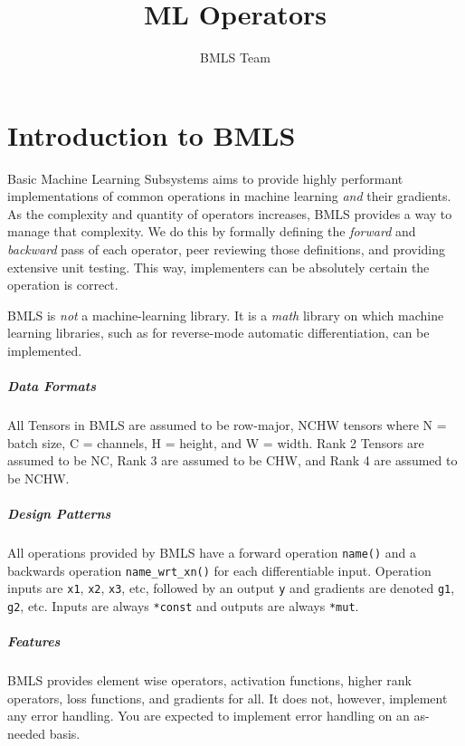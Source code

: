 \documentclass{report}
\title{ML Operators}
\author{BMLS Team}
\begin{document}
    \maketitle

    \tableofcontents

    \chapter{Introduction to BMLS}

    Basic Machine Learning Subsystems aims to provide highly performant implementations of common operations in machine learning \textit{and}
    their gradients. As the complexity and quantity of operators increases, BMLS provides a way to manage that complexity. We do this by 
    formally defining the \textit{forward} and \textit{backward} pass of each operator, peer reviewing those definitions, and providing extensive
    unit testing. This way, implementers can be absolutely certain the operation is correct.

        BMLS is \textit{not} a machine-learning library. It is a \textit{math} library on which machine learning libraries, such as for reverse-mode
        automatic differentiation, can be implemented.

        \paragraph{Data Formats}
        All Tensors in BMLS are assumed to be row-major, NCHW tensors where N = batch size, C = channels, H = height, and W = width. Rank 2 Tensors
        are assumed to be NC, Rank 3 are assumed to be CHW, and Rank 4 are assumed to be NCHW. 

        \paragraph{Design Patterns}
        All operations provided by BMLS have a forward operation \verb|name()| and a backwards operation \verb|name_wrt_xn()| for each 
        differentiable input. Operation inputs are \verb|x1|, \verb|x2|, \verb|x3|, etc, followed by an output \verb|y| and gradients are denoted 
        \verb|g1|, \verb|g2|, etc. Inputs are always \verb|*const| and outputs are always \verb|*mut|.
    
        \paragraph{Features}
        BMLS provides element wise operators, activation functions, higher rank operators, loss functions, and gradients for all. 
        It does not, however, implement any error handling. You are expected to implement error handling on an as-needed basis. 
\end{document}
